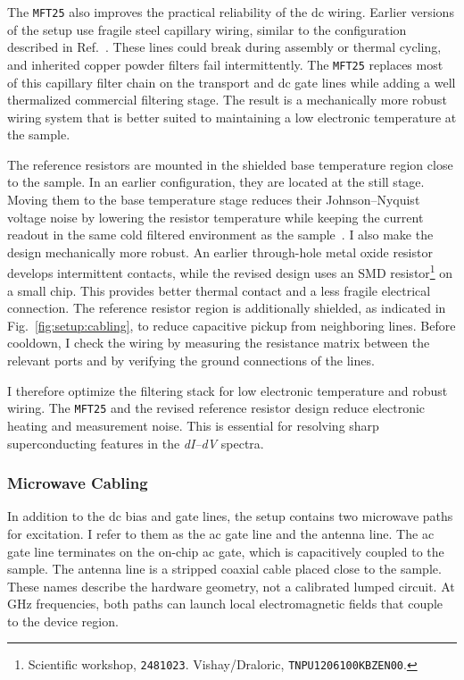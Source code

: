             The \texttt{MFT25} also improves the practical reliability of the dc wiring. Earlier versions of the setup use fragile steel capillary wiring, similar to the configuration described in Ref.~\cite{prestel_magnetic_2020}. These lines could break during assembly or thermal cycling, and inherited copper powder filters fail intermittently. The \texttt{MFT25} replaces most of this capillary filter chain on the transport and dc gate lines while adding a well thermalized commercial filtering stage. The result is a mechanically more robust wiring system that is better suited to maintaining a low electronic temperature at the sample.

            The reference resistors are mounted in the shielded base temperature region close to the sample. In an earlier configuration, they are located at the still stage. Moving them to the base temperature stage reduces their Johnson--Nyquist voltage noise by lowering the resistor temperature while keeping the current readout in the same cold filtered environment as the sample~\cite{johnson_thermal_1928,nyquist_thermal_1928}. I also make the design mechanically more robust. An earlier through-hole metal oxide resistor develops intermittent contacts, while the revised design uses an SMD resistor\footnote{Scientific workshop, \texttt{2481023}. Vishay/Draloric, \texttt{TNPU1206100KBZEN00}.} on a small chip. This provides better thermal contact and a less fragile electrical connection. The reference resistor region is additionally shielded, as indicated in Fig.~\ref{fig:setup:cabling}, to reduce capacitive pickup from neighboring lines. Before cooldown, I check the wiring by measuring the resistance matrix between the relevant ports and by verifying the ground connections of the lines.

            I therefore optimize the filtering stack for low electronic temperature and robust wiring. The \texttt{MFT25} and the revised reference resistor design reduce electronic heating and measurement noise. This is essential for resolving sharp superconducting features in the \textit{dI--dV} spectra.

        \subsubsection*{Microwave Cabling}

            In addition to the dc bias and gate lines, the setup contains two microwave paths for excitation. I refer to them as the ac gate line and the antenna line. The ac gate line terminates on the on-chip ac gate, which is capacitively coupled to the sample. The antenna line is a stripped coaxial cable placed close to the sample. These names describe the hardware geometry, not a calibrated lumped circuit. At GHz frequencies, both paths can launch local electromagnetic fields that couple to the device region.

